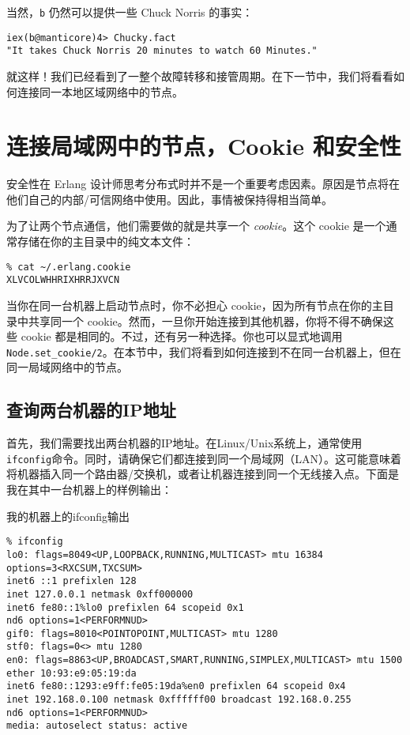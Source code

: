 当然，\texttt{b} 仍然可以提供一些 Chuck Norris 的事实：

\begin{code}{}
\begin{verbatim}
iex(b@manticore)4> Chucky.fact
"It takes Chuck Norris 20 minutes to watch 60 Minutes."
\end{verbatim}
\end{code}

就这样！我们已经看到了一整个故障转移和接管周期。在下一节中，我们将看看如何连接同一本地区域网络中的节点。

\section{连接局域网中的节点，Cookie 和安全性}

安全性在 Erlang
设计师思考分布式时并不是一个重要考虑因素。原因是节点将在他们自己的内部/可信网络中使用。因此，事情被保持得相当简单。

为了让两个节点通信，他们需要做的就是共享一个 \emph{cookie}。这个 cookie
是一个通常存储在你的主目录中的纯文本文件：

\begin{code}{}
\begin{verbatim}
% cat ~/.erlang.cookie
XLVCOLWHHRIXHRRJXVCN
\end{verbatim}
\end{code}

当你在同一台机器上启动节点时，你不必担心
cookie，因为所有节点在你的主目录中共享同一个
cookie。然而，一旦你开始连接到其他机器，你将不得不确保这些 cookie
都是相同的。不过，还有另一种选择。你也可以显式地调用
\texttt{Node.set\_cookie/2}。在本节中，我们将看到如何连接到不在同一台机器上，但在同一局域网络中的节点。

\subsection{查询两台机器的IP地址}

首先，我们需要找出两台机器的IP地址。在Linux/Unix系统上，通常使用\texttt{ifconfig}命令。同时，请确保它们都连接到同一个局域网（LAN）。这可能意味着将机器插入同一个路由器/交换机，或者让机器连接到同一个无线接入点。下面是我在其中一台机器上的样例输出：

\begin{code}{我的机器上的ifconfig输出}

\begin{verbatim}
% ifconfig
lo0: flags=8049<UP,LOOPBACK,RUNNING,MULTICAST> mtu 16384
options=3<RXCSUM,TXCSUM>
inet6 ::1 prefixlen 128
inet 127.0.0.1 netmask 0xff000000
inet6 fe80::1%lo0 prefixlen 64 scopeid 0x1
nd6 options=1<PERFORMNUD>
gif0: flags=8010<POINTOPOINT,MULTICAST> mtu 1280
stf0: flags=0<> mtu 1280
en0: flags=8863<UP,BROADCAST,SMART,RUNNING,SIMPLEX,MULTICAST> mtu 1500
ether 10:93:e9:05:19:da
inet6 fe80::1293:e9ff:fe05:19da%en0 prefixlen 64 scopeid 0x4
inet 192.168.0.100 netmask 0xffffff00 broadcast 192.168.0.255
nd6 options=1<PERFORMNUD>
media: autoselect status: active
\end{verbatim}
\end{code}

